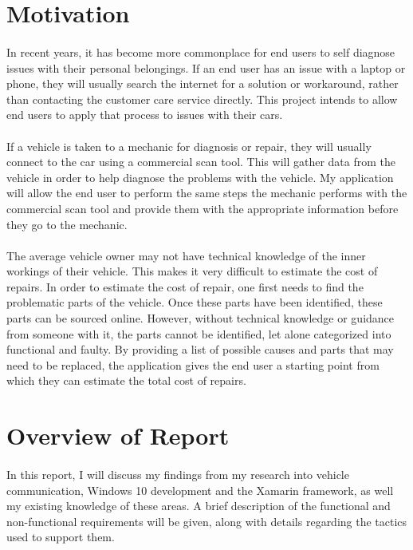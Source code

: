 \section{Motivation}
	\paragraph{}{
	In recent years, it has become more commonplace for end users to self diagnose issues with their personal belongings. If an end user has an issue with a laptop or phone, they will usually search the internet for a solution or workaround, rather than contacting the customer care service directly. This project intends to allow end users to apply that process to issues with their cars.
	}
	\paragraph{}{
	If a vehicle is taken to a mechanic for diagnosis or repair, they will usually connect to the car using a commercial scan tool. This will gather data from the vehicle in order to help diagnose the problems with the vehicle. My application will allow the end user to perform the same steps the mechanic performs with the commercial scan tool and provide them with the appropriate information before they go to the mechanic.
	}
	\paragraph{}{
	The average vehicle owner may not have technical knowledge of the inner workings of their vehicle. This makes it very difficult to estimate the cost of repairs. In order to estimate the cost of repair, one first needs to find the problematic parts of the vehicle. Once these parts have been identified, these parts can be sourced online. However, without technical knowledge or guidance from someone with it, the parts cannot be identified, let alone categorized into functional and faulty. By providing a list of possible causes and parts that may need to be replaced, the application gives the end user a starting point from which they can estimate the total cost of repairs. 
	}

\section{Overview of Report}
	\paragraph{}{
	In this report, I will discuss my findings from my research into vehicle communication, Windows 10 development and the Xamarin framework, as well my existing knowledge of these areas. A brief description of the functional and non-functional requirements will be given, along with details regarding the tactics used to support them. 
	}
